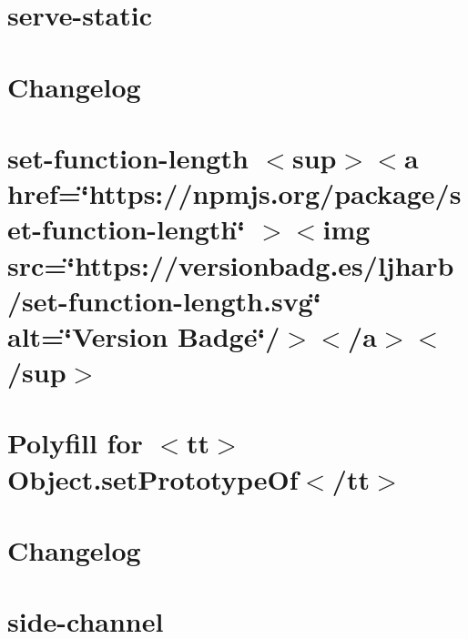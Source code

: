 \documentclass[twoside]{book}
\newcommand{\+}{\discretionary{\mbox{\scriptsize$\hookleftarrow$}}{}{}}
\begin{document}
\chapter{serve-\/static}
\label{md_Backend_nodejs_node_modules_serve_static_README}

\chapter{Changelog}
\label{md_Backend_nodejs_node_modules_set_function_length_CHANGELOG}

\chapter{set-\/function-\/length \texorpdfstring{$<$}{<}sup\texorpdfstring{$>$}{>}\texorpdfstring{$<$}{<}a href=\char`\"{}https\+://npmjs.\+org/package/set-\/function-\/length\char`\"{} \texorpdfstring{$>$}{>}\texorpdfstring{$<$}{<}img src=\char`\"{}https\+://versionbadg.\+es/ljharb/set-\/function-\/length.\+svg\char`\"{} alt=\char`\"{}\+Version Badge\char`\"{}/\texorpdfstring{$>$}{>}\texorpdfstring{$<$}{<}/a\texorpdfstring{$>$}{>}\texorpdfstring{$<$}{<}/sup\texorpdfstring{$>$}{>}}
\label{md_Backend_nodejs_node_modules_set_function_length_README}

\chapter{Polyfill for \texorpdfstring{$<$}{<}tt\texorpdfstring{$>$}{>}Object.\+set\+Prototype\+Of\texorpdfstring{$<$}{<}/tt\texorpdfstring{$>$}{>}}
\label{md_Backend_nodejs_node_modules_setprototypeof_README}

\chapter{Changelog}
\label{md_Backend_nodejs_node_modules_side_channel_CHANGELOG}

\chapter{side-\/channel}
\label{md_Backend_nodejs_node_modules_side_channel_README}

\end{document}

